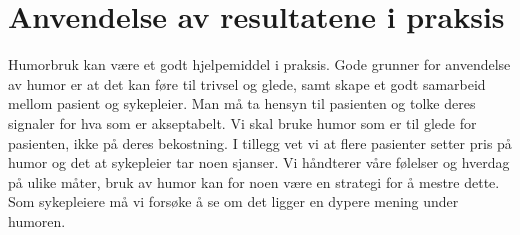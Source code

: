 \chapter{Anvendelse av resultatene i praksis}

Humorbruk kan være et godt hjelpemiddel i praksis. Gode grunner for anvendelse
av humor er at det kan føre til trivsel og glede, samt skape et godt samarbeid
mellom pasient og sykepleier. Man må ta hensyn til pasienten og tolke deres
signaler for hva som er akseptabelt. Vi skal bruke humor som er til glede for
pasienten, ikke på deres bekostning. I tillegg vet vi at flere pasienter setter
pris på humor og det at sykepleier tar noen sjanser. Vi håndterer våre følelser
og hverdag på ulike måter, bruk av humor kan for noen være en strategi for å
mestre dette. Som sykepleiere må vi forsøke å se om det ligger en dypere mening
under humoren.
